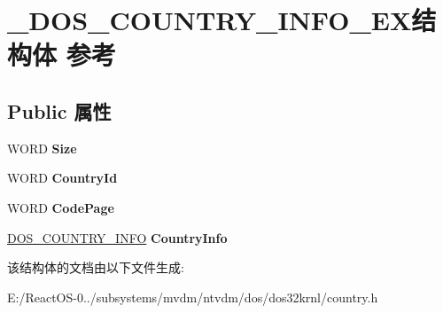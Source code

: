 \hypertarget{struct___d_o_s___c_o_u_n_t_r_y___i_n_f_o___e_x}{}\section{\+\_\+\+D\+O\+S\+\_\+\+C\+O\+U\+N\+T\+R\+Y\+\_\+\+I\+N\+F\+O\+\_\+\+E\+X结构体 参考}
\label{struct___d_o_s___c_o_u_n_t_r_y___i_n_f_o___e_x}
\subsection*{Public 属性}
\begin{DoxyCompactItemize}
\item 
\mbox{\label{struct___d_o_s___c_o_u_n_t_r_y___i_n_f_o___e_x_a46046390a8ffc77bc0a740b9cd8b9c81}} 
W\+O\+RD {\bfseries Size}
\item 
\mbox{\label{struct___d_o_s___c_o_u_n_t_r_y___i_n_f_o___e_x_a0693ee66b29c4d39e1f97981bcc6db69}} 
W\+O\+RD {\bfseries Country\+Id}
\item 
\mbox{\label{struct___d_o_s___c_o_u_n_t_r_y___i_n_f_o___e_x_a6e9168ed47540aacf23aec32ec21f34f}} 
W\+O\+RD {\bfseries Code\+Page}
\item 
\mbox{\label{struct___d_o_s___c_o_u_n_t_r_y___i_n_f_o___e_x_aecdc71e37c9dc69fe171c5eabaae8067}} 
\hyperlink{struct___d_o_s___c_o_u_n_t_r_y___i_n_f_o}{D\+O\+S\+\_\+\+C\+O\+U\+N\+T\+R\+Y\+\_\+\+I\+N\+FO} {\bfseries Country\+Info}
\end{DoxyCompactItemize}


该结构体的文档由以下文件生成\+:\begin{DoxyCompactItemize}
\item 
E\+:/\+React\+O\+S-\/0../subsystems/mvdm/ntvdm/dos/dos32krnl/country.\+h\end{DoxyCompactItemize}
